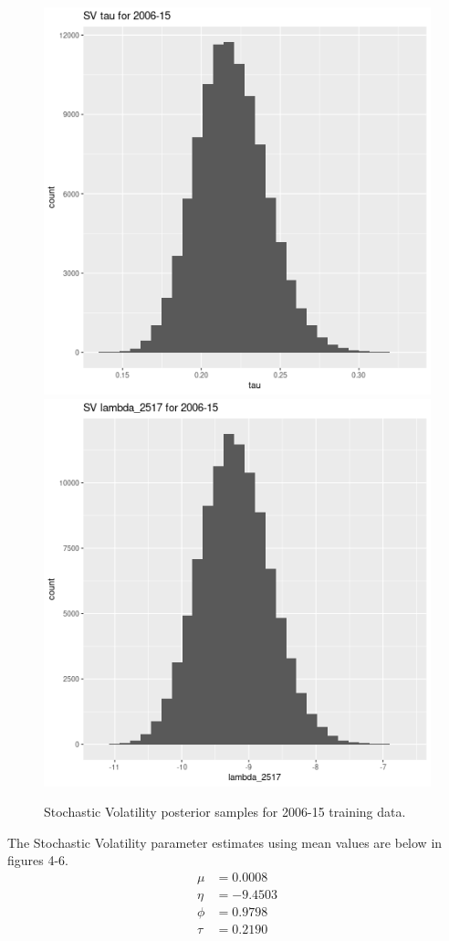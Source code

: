 \documentclass[12pt,letterpaper,reqno,fleqn]{article}
\begin{document}
\begin{figure}
\includegraphics[scale = .4]{svt0615}
\includegraphics[scale = .4]{svlT0615}
\caption{Stochastic Volatility posterior samples for 2006-15 training data.}
\end{figure}

The Stochastic Volatility parameter estimates using mean values are below in figures 4-6.
\begin{align*}
\mu &= 0.0008 \\
\eta &= -9.4503 \\
\phi &= 0.9798 \\
\tau &= 0.2190 
\end{align*}
\end{document}
